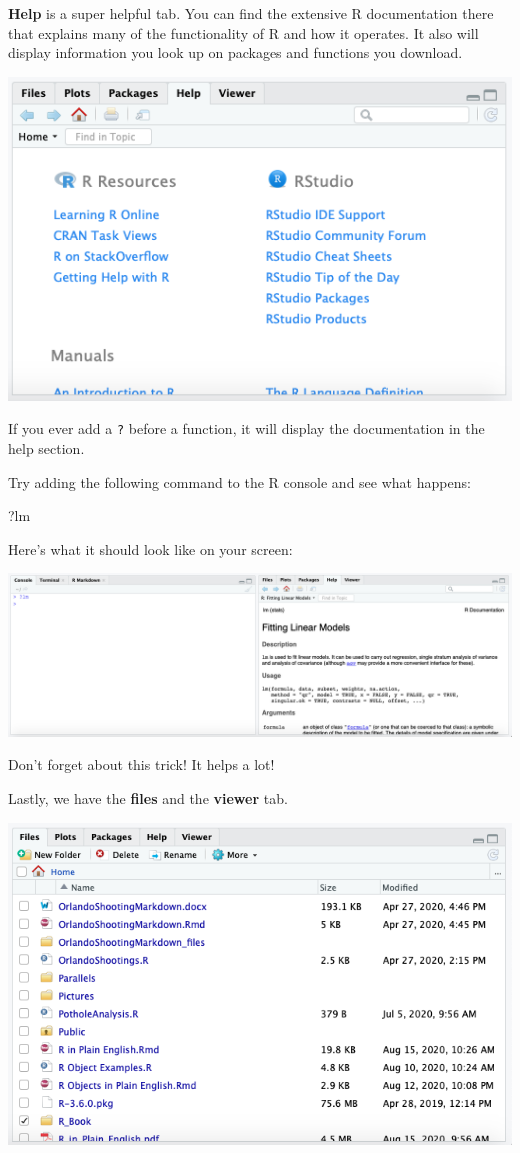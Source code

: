 \documentclass[
]{book}
\newenvironment{Shaded}{\begin{snugshade}}{\end{snugshade}}
\newcommand{\NormalTok}[1]{#1}
\begin{document}
\textbf{Help} is a super helpful tab. You can find the extensive R documentation there that explains many of the functionality of R and how it operates. It also will display information you look up on packages and functions you download.

\begin{center}\includegraphics[width=0.75\linewidth]{1.26_Help} \end{center}

If you ever add a \texttt{?} before a function, it will display the documentation in the help section.

Try adding the following command to the R console and see what happens:

\begin{Shaded}
\begin{Highlighting}[]
\NormalTok{  ?lm}
\end{Highlighting}
\end{Shaded}

Here's what it should look like on your screen:

\begin{center}\includegraphics[width=0.75\linewidth]{1.27_HelpLookup} \end{center}

Don't forget about this trick! It helps a lot!

Lastly, we have the \textbf{files} and the \textbf{viewer} tab.

\begin{center}\includegraphics[width=0.75\linewidth]{1.28_Files} \end{center}
\end{document}
